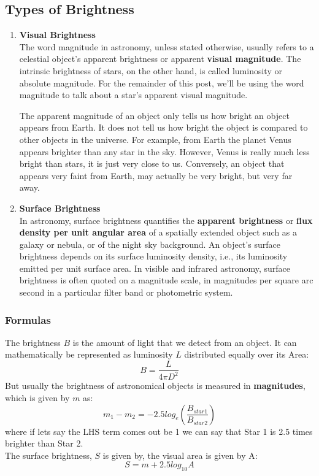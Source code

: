 \documentclass{article}
\begin{document}
\subsection{Types of Brightness}
\begin{enumerate}
    \item \textbf{Visual Brightness}\\
    The word magnitude in astronomy, unless stated otherwise, usually refers to a celestial object’s apparent brightness or apparent \textbf{visual magnitude}. The intrinsic brightness of stars, on the other hand, is called luminosity or absolute magnitude. For the remainder of this post, we’ll be using the word magnitude to talk about a star’s apparent visual magnitude. \par
    
    The apparent magnitude of an object only tells us how bright an object appears from Earth. It does not tell us how bright the object is compared to other objects in the universe. For example, from Earth the planet Venus appears brighter than any star in the sky. However, Venus is really much less bright than stars, it is just very close to us. Conversely, an object that appears very faint from Earth, may actually be very bright, but very far away. 
    
    \item \textbf{Surface Brightness}\\
    In astronomy, surface brightness quantifies the \textbf{apparent brightness} or \textbf{flux density per unit angular area} of a spatially extended object such as a galaxy or nebula, or of the night sky background. An object's surface brightness depends on its surface luminosity density, i.e., its luminosity emitted per unit surface area. In visible and infrared astronomy, surface brightness is often quoted on a magnitude scale, in magnitudes per square arc second in a particular filter band or photometric system.
\end{enumerate}
\subsubsection{Formulas}
The brightness $B$ is the amount of light that we detect from an object. It can mathematically be represented as luminosity $L$ distributed equally over its Area: 
$$B=\frac{L}{4 \pi D^2}$$
But usually the brightness of astronomical objects is measured in \textbf{magnitudes}, which is given by $m$ as:
$$m_1-m_2=-2.5 log_e (\frac{B_{star1}}{B_{star2}})$$
where if lets say the LHS term comes out be 1 we can say that Star 1 is 2.5 times brighter than Star 2. \\
The surface brightness, $S$ is given by, the visual area is given by A:
$$S=m+2.5 log_{10} A$$
\end{document}

